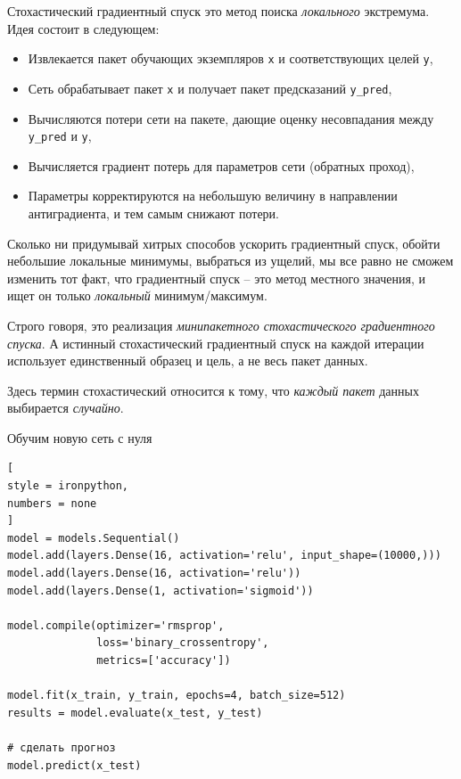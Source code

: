 \documentclass[%
	11pt,
	a4paper,
	utf8,
		]{article}
\begin{document}
Стохастический градиентный спуск это метод поиска \emph{локального} экстремума. Идея состоит в следующем:
\begin{itemize}
	\item Извлекается пакет обучающих экземпляров \texttt{x} и соответствующих целей \texttt{y},
	
	\item Сеть обрабатывает пакет \texttt{x} и получает пакет предсказаний \texttt{y\_pred},
	
	\item Вычисляются потери сети на пакете, дающие оценку несовпадания между \texttt{y\_pred} и \texttt{y},
	
	\item Вычисляется градиент потерь для параметров сети (обратных проход),
	
	\item Параметры корректируются на небольшую величину в направлении антиградиента, и тем самым снижают потери.
\end{itemize}

Сколько ни придумывай хитрых способов ускорить градиентный спуск, обойти небольшие локальные минимумы, выбраться из ущелий, мы все равно не сможем изменить тот факт, что градиентный спуск -- это метод местного значения, и ищет он только \emph{локальный} минимум/максимум.

Строго говоря, это реализация \emph{минипакетного стохастического градиентного спуска}. А истинный стохастический градиентный спуск на каждой итерации использует единственный образец и цель, а не весь пакет данных.

Здесь термин стохастический относится к тому, что \emph{каждый пакет} данных выбирается \emph{случайно}.

Обучим новую сеть с нуля 
\begin{lstlisting}[
style = ironpython,
numbers = none
]
model = models.Sequential()
model.add(layers.Dense(16, activation='relu', input_shape=(10000,)))
model.add(layers.Dense(16, activation='relu'))
model.add(layers.Dense(1, activation='sigmoid'))

model.compile(optimizer='rmsprop',
              loss='binary_crossentropy',
              metrics=['accuracy'])
              
model.fit(x_train, y_train, epochs=4, batch_size=512)
results = model.evaluate(x_test, y_test)

# сделать прогноз
model.predict(x_test)
\end{lstlisting}
\end{document}
